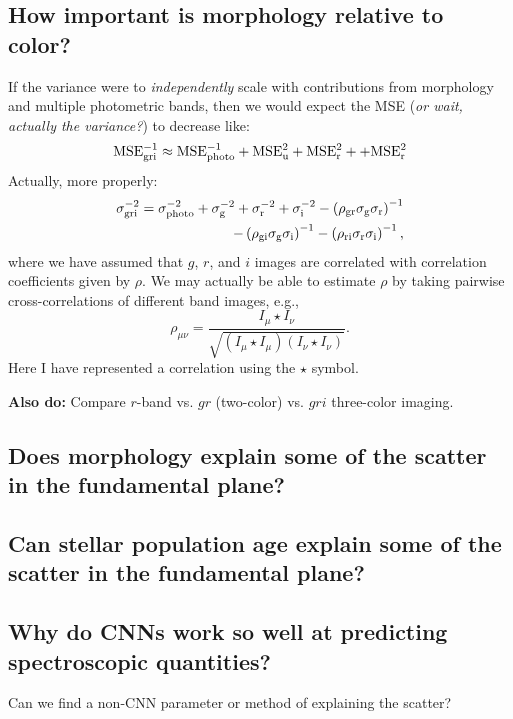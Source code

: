 \documentclass[fleqn,usenatbib]{mnras}
\begin{document}
\subsection{How important is morphology relative to color?}
If the variance were to \textit{independently} scale with contributions from morphology and multiple photometric bands, then we would expect the MSE (\textit{or wait, actually the variance?}) to decrease like:
\begin{equation}
	{\rm MSE_{\rm gri}^{-1}} \approx {\rm MSE_{\rm photo}^{-1} + MSE_{\rm u}^2 + MSE_{\rm r}^2 + + MSE_{\rm r}^2}
\end{equation}
Actually, more properly:
\begin{eqnarray}
	\sigma_{\rm gri}^{-2} = \sigma_{\rm photo}^{-2} + \sigma_{\rm g}^{-2} + \sigma_{\rm r}^{-2} + \sigma_{\rm i}^{-2} 
	- \left (\rho_{\rm gr}\sigma_{\rm g}\sigma_{\rm r}\right )^{-1} \nonumber\\
	- \left (\rho_{\rm gi}\sigma_{\rm g}\sigma_{\rm i}\right )^{-1}
	- \left (\rho_{\rm ri}\sigma_{\rm r}\sigma_{\rm i}\right )^{-1},
\end{eqnarray}
where we have assumed that $g$, $r$, and $i$ images are correlated with correlation coefficients given by $\rho$.
We may actually be able to estimate $\rho$ by taking pairwise cross-correlations of different band images, e.g.,
\begin{equation}
\rho_{\mu \nu} = \frac{I_\mu \star I_\nu }{\sqrt{\left (I_\mu \star I_\mu \right ) \left (I_\nu \star I_\nu\right )}}.
\end{equation}
Here I have represented a correlation using the $\star$ symbol.


\textbf{Also do:} Compare $r$-band vs. $gr$ (two-color) vs. $gri$ three-color imaging.


\subsection{Does morphology explain some of the scatter in the fundamental plane?}

\subsection{Can stellar population age explain some of the scatter in the fundamental plane?}

\subsection{Why do CNNs work so well at predicting spectroscopic quantities?}
Can we find a non-CNN parameter or method of explaining the scatter?
\end{document}
